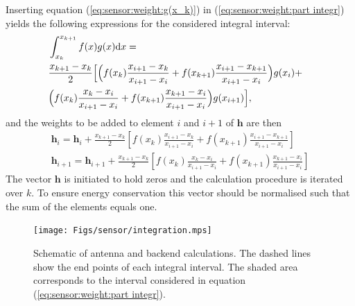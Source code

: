 Inserting equation (\ref{eq:sensor:weight:g(x_k)}) in (\ref{eq:sensor:weight:part integr})
yields the following expressions for the considered integral interval:
\begin{eqnarray}
  &\int_{x_k}^{x_{k+1}}f(x)g(x)\mathrm{d} x = & \nonumber \\
  & \frac{x_{k+1}-x_k}{2}\Bigr[ \Bigr( 
  f(x_k)\frac{x_{i+1}-x_k}{x_{i+1}-x_i} + 
  f(x_{k+1})\frac{x_{i+1}-x_{k+1}}{x_{i+1}-x_i} \Bigl)g(x_i) +&\nonumber\\
  & \Bigr( f(x_k)\frac{x_k-x_i}{x_{i+1}-x_i} + 
  f(x_{k+1})\frac{x_{k+1}-x_i}{x_{i+1}-x_i} \Bigl)g(x_{i+1}) \Bigl], &
\end{eqnarray}
and the weights to be added to element $i$ and $i+1$ of
$\mathbf{h}$ are then
\begin{eqnarray}
  &\mathbf{h}_i = \mathbf{h}_i + \frac{x_{k+1}-x_k}{2} \left[ f(x_k)
                  \frac{x_{i+1}-x_k}{x_{i+1}-x_i} + f(x_{k+1})
                  \frac{x_{i+1}-x_{k+1}}{x_{i+1}-x_i} \right] & \\
  &\mathbf{h}_{i+1} = \mathbf{h}_{i+1}+
                     \frac{x_{k+1}-x_k}{2} \left[ f(x_k)
                     \frac{x_k-x_i}{x_{i+1}-x_i} + f(x_{k+1})
                     \frac{x_{k+1}-x_i}{x_{i+1}-x_i} \right] &
\end{eqnarray} 
The vector $\mathbf{h}$ is initiated to hold zeros and the
calculation procedure is iterated over $k$. To ensure energy
conservation this vector should be normalised such that the sum of
the elements equals one.
\begin{figure}[!h]
\begin{center}
  \texttt{[image: Figs/sensor/integration.mps]}
  \caption{Schematic of antenna and backend calculations. The dashed 
    lines show the end points of each integral interval. The
    shaded area corresponds to the interval considered in
    equation (\ref{eq:sensor:weight:part integr}).}
  \label{fig:sensor:weight}
\end{center}
\end{figure}

